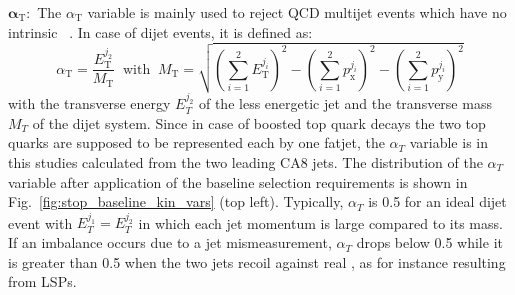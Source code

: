 \begin{description}
 \item $\mathbf{\alpha_\mathrm{T}:}$ The $\alpha_\mathrm{T}$ variable is mainly used to reject QCD multijet events which have no intrinsic \met~\cite{Chatrchyan:2012wa, Chatrchyan:2013lya}. In case of dijet events, it is defined as:
\begin{equation}
 \alpha_\mathrm{T} = \frac{E_\mathrm{T}^{j_2}}{M_\mathrm{T}} \;\; \mathrm{with} \;\; M_\mathrm{T} = \sqrt{\left( \sum_{i=1}^{2} E_\mathrm{T}^{j_i} \right)^2 - \left( \sum_{i=1}^{2} p_\mathrm{x}^{j_i} \right)^2 - \left( \sum_{i=1}^{2} p_\mathrm{y}^{j_i} \right)^2}
\end{equation}
with the transverse energy $E_T^{j_2}$ of the less energetic jet and the transverse mass $M_T$ of the dijet system. Since in case of boosted top quark decays the two top quarks are supposed to be represented each by one fatjet, the $\alpha_T$ variable is in this studies calculated from the two leading CA8 jets. The distribution of the $\alpha_T$ variable after application of the baseline selection requirements is shown in Fig.~\ref{fig:stop_baseline_kin_vars} (top left). Typically, $\alpha_T$ is 0.5 for an ideal dijet event with $E_T^{j_1} = E_T^{j_2}$ in which each jet momentum is large compared to its mass. If an imbalance occurs due to a jet mismeasurement, $\alpha_T$ drops below 0.5 while it is greater than 0.5 when the two jets recoil against real \met, as for instance resulting from LSPs.


\end{description}
